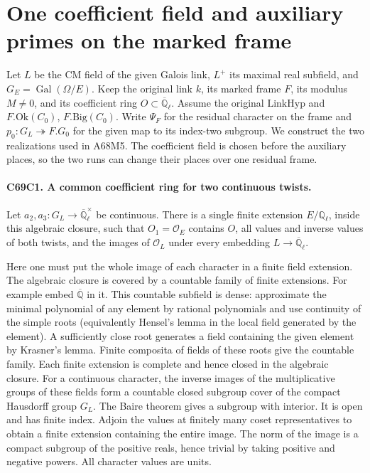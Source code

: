 \section{One coefficient field and auxiliary primes on the marked frame}

Let $L$ be the CM field of the given Galois link, $L^+$ its maximal
real subfield, and $G_E=\operatorname{Gal}(\Omega/E)$. Keep the
original link $k$, its marked frame $F$, its modulus $M\ne0$, and its
coefficient ring $O\subset\overline{\mathbb Q}_\ell$. Assume the
original $\mathrm{LinkHyp}$ and $F.\mathrm{Ok}(C_0)$,
$F.\mathrm{Big}(C_0)$. Write $\Psi_F$ for the residual character
on the frame and $p_0:G_L\twoheadrightarrow F.G_0$ for the given
map to its index-two subgroup. We construct the two realizations
used in A68M5. The coefficient field is chosen before the auxiliary
places, so the two runs can change their places over one residual
frame.

\paragraph{C69C1. A common coefficient ring for two continuous twists.}
Let $a_2,a_3:G_L\to\overline{\mathbb Q}_\ell^{\times}$ be continuous.
There is a single finite extension $E/\mathbb Q_\ell$, inside this
algebraic closure, such that $O_1=\mathcal O_E$ contains $O$, all
values and inverse values of both twists, and the images of
$\mathcal O_L$ under every embedding $L\to\overline{\mathbb Q}_\ell$.

Here one must put the whole image of each character in a finite
field extension. The algebraic closure is covered by a countable
family of finite extensions. For example embed $\overline{\mathbb Q}$
in it. This countable subfield is dense: approximate the minimal
polynomial of any element by rational polynomials and use continuity
of the simple roots (equivalently Hensel's lemma in the local field
generated by the element). A sufficiently close root generates a
field containing the given element by Krasner's lemma. Finite
composita of fields of these roots give the countable family. Each
finite extension is complete and hence closed in the algebraic
closure. For a continuous character, the inverse images of the
multiplicative groups of these fields form a countable closed
subgroup cover of the compact Hausdorff group $G_L$. The Baire
theorem gives a subgroup with interior. It is open and has finite
index. Adjoin the values at finitely many coset representatives to
obtain a finite extension containing the entire image. The norm of
the image is a compact subgroup of the positive reals, hence trivial
by taking positive and negative powers. All character values are units.

